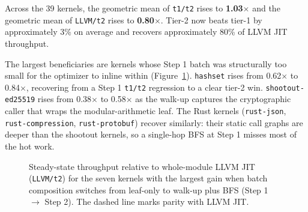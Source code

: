 Across the 39 kernels, the geometric mean of \texttt{t1/t2} rises to \textbf{1.03$\times$} and the geometric mean of \texttt{LLVM/t2} rises to \textbf{0.80$\times$}. Tier-2 now beats tier-1 by approximately 3\% on average and recovers approximately 80\% of LLVM JIT throughput.

The largest beneficiaries are kernels whose Step 1 batch was structurally too small for the optimizer to inline within (Figure~\ref{fig:eval:walkup}). \texttt{hashset} rises from 0.62$\times$ to 0.84$\times$, recovering from a Step 1 \texttt{t1/t2} regression to a clear tier-2 win. \texttt{shootout-ed25519} rises from 0.38$\times$ to 0.58$\times$ as the walk-up captures the cryptographic caller that wraps the modular-arithmetic leaf. The Rust kernels (\texttt{rust-json}, \texttt{rust-compression}, \texttt{rust-protobuf}) recover similarly: their static call graphs are deeper than the shootout kernels, so a single-hop BFS at Step 1 misses most of the hot work.

\begin{figure}[h]
\centering
{}
\caption{Steady-state throughput relative to whole-module LLVM JIT (\texttt{LLVM/t2}) for the seven kernels with the largest gain when batch composition switches from leaf-only to walk-up plus BFS (Step 1 $\to$ Step 2). The dashed line marks parity with LLVM JIT.}
\label{fig:eval:walkup}
\end{figure}

